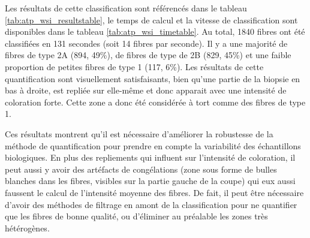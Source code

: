 Les résultats de cette classification sont référencés dans le tableau \ref{tab:atp_wsi_resultstable}, le temps de calcul et la vitesse de classification sont disponibles dans le tableau \ref{tab:atp_wsi_timetable}. Au total, 1840 fibres ont été classifiées en 131 secondes (soit 14 fibres par seconde). Il y a une majorité de fibres de type 2A (894, 49\%), de fibres de type de 2B (829, 45\%) et une faible proportion de petites fibres de type 1 (117, 6\%). Les résultats de cette quantification sont visuellement satisfaisants, bien qu'une partie de la biopsie en bas à droite, est repliée sur elle-même et donc apparait avec une intensité de coloration forte. Cette zone a donc été considérée à tort comme des fibres de type 1. 

Ces résultats montrent qu'il est nécessaire d'améliorer la robustesse de la méthode de quantification pour prendre en compte la variabilité des échantillons biologiques. En plus des repliements qui influent sur l'intensité de coloration, il peut aussi y avoir des artéfacts de congélations (zone sous forme de bulles blanches dans les fibres, visibles sur la partie gauche de la coupe) qui eux aussi faussent le calcul de l'intensité moyenne des fibres. De fait, il peut être nécessaire d'avoir des méthodes de filtrage en amont de la classification pour ne quantifier que les fibres de bonne qualité, ou d'éliminer au préalable les zones très hétérogènes.

